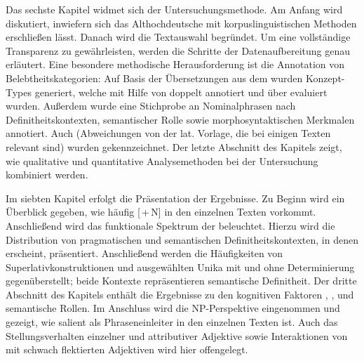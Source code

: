 Das sechste Kapitel widmet sich der Untersuchungsmethode. Am Anfang wird diskutiert, inwiefern sich das Althochdeutsche mit korpuslinguistischen Methoden  erschließen lässt. Danach wird die Textauswahl begründet. Um eine vollständige Transparenz zu gewährleisten, werden die Schritte der Datenaufbereitung genau erläutert. Eine besondere methodische Herausforderung ist die Anno\-ta\-tion  von Belebtheitskategorien:  Auf Basis der Übersetzungen aus dem   wurden Konzept-Types generiert, welche mit Hilfe von  doppelt annotiert und über   evaluiert wurden. Außerdem wurde eine Stichprobe an Nominalphrasen  nach Definitheitskontexten, semantischer Rolle  sowie morphosyntaktischen Merkmalen annotiert. Auch  (Abweichungen von der lat. Vorlage, die bei einigen Texten relevant sind) wurden gekennzeichnet. Der letzte Abschnitt des Kapitels zeigt, wie qualitative und quantitative Analysemethoden bei der Untersuchung kombiniert werden. 
  
Im siebten Kapitel erfolgt die Präsentation der Ergebnisse. Zu Beginn wird ein Überblick gegeben, wie häufig [\,+\,N] in den einzelnen Texten vorkommt. Anschließend wird das funktionale Spektrum der  beleuchtet. Hierzu wird die Distribution von pragmatischen  und semantischen Definitheitskontexten,  in denen  erscheint, präsentiert. Anschließend werden die Häufigkeiten von Superlativkonstruktionen  und ausgewählten Unika  mit und ohne Determinierung gegenüberstellt; beide Kontexte repräsentieren semantische Definitheit.  Der dritte Abschnitt des Kapitels enthält die Ergebnisse zu den kognitiven Faktoren , ,  und semantische Rollen. Im Anschluss wird die NP-Perspektive  eingenommen und gezeigt, wie salient  als Phraseneinleiter  in den einzelnen Texten ist. Auch das Stellungsverhalten  einzelner  und attributiver Adjektive  sowie Interaktionen von  mit schwach flektierten Adjektiven  wird hier offengelegt. 

